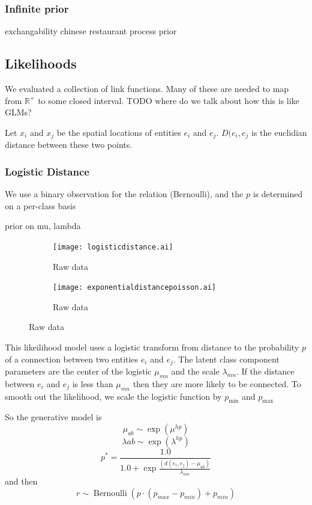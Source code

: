 \documentclass{article}
\begin{document}
\subsubsection{Infinite prior}
exchangability 
chinese restaurant process prior



\subsection{Likelihoods}
We evaluated a collection of link functions. 
Many of these are needed to map from $\mathbb{R}^+$ to some closed interval. 
TODO where do we talk about how this is like GLMs? 

Let $x_i$ and $x_j$ be the spatial locations of entities $e_i$ and $e_j$. $D(e_i, e_j$ is the euclidian distance between these two points. 
 
\subsubsection{Logistic Distance}
We use a binary observation for the relation (Bernoulli), and the $p$ is determined
on a per-class basis

prior on mu, lambda

\begin{figure}
  \centering 
  \begin{subfigure}[b]{0.4\textwidth}
    \texttt{[image: logisticdistance.ai]}
    \caption{Raw data}
    \label{fig:gull}
  \end{subfigure}

  \begin{subfigure}[b]{0.4\textwidth}
    \texttt{[image: exponentialdistancepoisson.ai]}
    \caption{Raw data}
    \label{fig:gull}
  \end{subfigure}

\end{figure}

This likeilihood model uses a logistic transform from distance to the
probability $p$ of a connection between two entities $e_i$ and
$e_j$. The latent class component parameters are the center of the
logistic $\mu_{mn}$ and the scale $\lambda_{mn}$. If the distance
between $e_i$ and $e_j$ is less than $\mu_{mn}$ then they are more
likely to be connected. To smooth out the likelihood, we scale the logistic
function by $p_{\textrm{min}}$ and $p_{\textrm{max}}$

So the generative model is
\[\mu_{ab} \sim \exp(\mu^{hp}) \]
\[\lambda{ab} \sim \exp(\lambda^{hp}) \]
\[p^* = \frac{1.0}{1.0 + \exp{\frac{(d(e_i, e_j) - \mu_{ab})}{\lambda_{mn}}}}\]
and then 
\[ r \sim \operatorname{Bernoulli}(p\cdot (p_{max} - p_{min}) + p_{min}) \]
\end{document}
